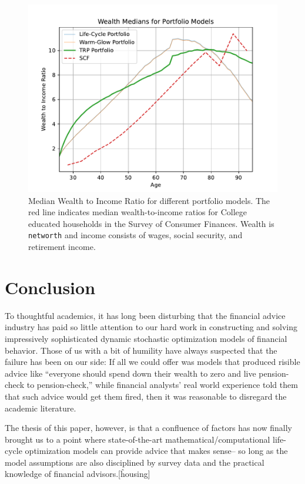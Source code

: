 \documentclass{article}
\begin{document}
\begin{figure}[!htbp]
\centering
\includegraphics[width=0.7\linewidth]{files/median_wealth-d1d3ba30e1007068b9011bcb3913c901.pdf}
\caption[]{Median Wealth to Income Ratio for different portfolio models. The red line indicates median wealth-to-income ratios for College educated households in the Survey of Consumer Finances. Wealth is \texttt{networth} and income consists of wages, social security, and retirement income.}
\label{medwealth}
\end{figure}

\section{Conclusion}

To thoughtful academics, it has long been disturbing that the financial advice industry has paid so little attention to our hard work in constructing and solving impressively sophisticated dynamic stochastic optimization models of financial behavior.
Those of us with a bit of humility have always suspected that the failure has been on our side: If all we could offer was models that produced risible advice like ``everyone should spend down their wealth to zero and live pension-check to pension-check,'' while financial analysts' real world experience told them that such advice would get them fired, then it was reasonable to disregard the academic literature.

The thesis of this paper, however, is that a confluence of factors has now finally brought us to a point where state-of-the-art mathematical/computational life-cycle optimization models can provide advice that makes sense-- so long as the model assumptions are also disciplined by survey data and the practical knowledge of financial advisors.[\^housing]
\end{document}
